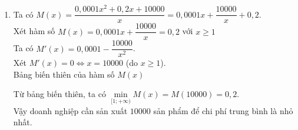 \begin{bt}
{\begin{enumerate}
			\item
			Ta có $M(x)=\dfrac{0{,}0001x^2+0{,}2x+10000}{x}=0{,}0001x+\dfrac{10000}{x}+0{,}2$. \\
			Xét hàm số $M(x)=0{,}0001x+\dfrac{10000}{x}=0{,}2$ với $x\geqslant 1$ \\
			Ta có $M'(x)=0{,}0001-\dfrac{10000}{x^2}$. \\
			Xét $M'(x)=0 \Leftrightarrow x=10000$ (do $x\geqslant1$). \\
			Bảng biến thiên của hàm số $M(x)$
			\begin{center}
			\end{center}
			Từ bảng biến thiên, ta có $\min\limits_{[1;+\infty)} M(x)=M(10000)=0{,}2$. \\
			Vậy doanh nghiệp cần sản xuất $10000$ sản phẩm để chi phí trung bình là nhỏ nhất.
		\end{enumerate}
	}
\end{bt}

